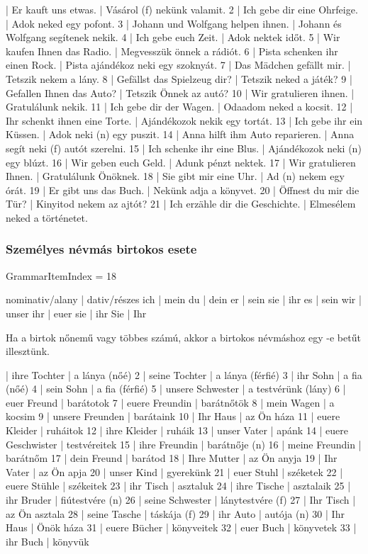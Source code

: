 \documentclass{article}
\newenvironment{desc}{\verbatim}{\endverbatim}
\newenvironment{exmp}{\verbatim}{\endverbatim}
\begin{document}
\begin{exmp}
1 | Er kauft uns etwas. | Vásárol (f) nekünk valamit.
2 | Ich gebe dir eine Ohrfeige. | Adok neked egy pofont.
3 | Johann und Wolfgang helpen ihnen. | Johann és Wolfgang segítenek nekik.
4 | Ich gebe euch Zeit. | Adok nektek időt.
5 | Wir kaufen Ihnen das Radio. | Megvesszük önnek a rádiót.
6 | Pista schenken ihr einen Rock. | Pista ajándékoz neki egy szoknyát.
7 | Das Mädchen gefällt mir. | Tetszik nekem a lány.
8 | Gefällst das Spielzeug dir? | Tetszik neked a játék?
9 | Gefallen Ihnen das Auto? | Tetszik Önnek az autó?
10 | Wir gratulieren ihnen. | Gratulálunk nekik.
11 | Ich gebe dir der Wagen. | Odaadom neked a kocsit.
12 | Ihr schenkt ihnen eine Torte. | Ajándékozok nekik egy tortát.
13 | Ich gebe ihr ein Küssen. | Adok neki (n) egy puszit.
14 | Anna hilft ihm Auto reparieren. | Anna segít neki (f) autót szerelni.
15 | Ich schenke ihr eine Blus. | Ajándékozok neki (n) egy blúzt.
16 | Wir geben euch Geld. | Adunk pénzt nektek.
17 | Wir gratulieren Ihnen. | Gratulálunk Önöknek.
18 | Sie gibt mir eine Uhr. | Ad (n) nekem egy órát.
19 | Er gibt uns das Buch. | Nekünk adja a könyvet.
20 | Öffnest du mir die Tür? | Kinyitod nekem az ajtót?
21 | Ich erzähle dir die Geschichte. | Elmesélem neked a történetet.
\end{exmp}

\subsubsection{Személyes névmás birtokos esete}

GrammarItemIndex = 18

\begin{desc}
nominativ/alany | dativ/részes 
ich             | mein
du              | dein
er              | sein
sie             | ihr
es              | sein
wir             | unser
ihr             | euer
sie             | ihr
Sie             | Ihr

Ha a birtok nőnemű vagy többes számú, akkor a birtokos névmáshoz
egy -e betűt illesztünk.
\end{desc}

\begin{exmp}
1 | ihre Tochter | a lánya (nőé)
2 | seine Tochter | a lánya (férfié)
3 | ihr Sohn | a fia (nőé)
4 | sein Sohn | a fia (férfié)
5 | unsere Schwester | a testvérünk (lány)
6 | euer Freund | barátotok
7 | euere Freundin | barátnőtök
8 | mein Wagen | a kocsim
9 | unsere Freunden | barátaink
10 | Ihr Haus | az Ön háza
11 | euere Kleider | ruháitok
12 | ihre Kleider | ruháik
13 | unser Vater | apánk
14 | euere Geschwister | testvéreitek
15 | ihre Freundin | barátnője (n)
16 | meine Freundin | barátnőm
17 | dein Freund | barátod
18 | Ihre Mutter | az Ön anyja
19 | Ihr Vater | az Ön apja
20 | unser Kind | gyerekünk
21 | euer Stuhl | széketek
22 | euere Stühle | székeitek
23 | ihr Tisch | asztaluk
24 | ihre Tische | asztalaik
25 | ihr Bruder | fiútestvére (n)
26 | seine Schwester | lánytestvére (f)
27 | Ihr Tisch | az Ön asztala
28 | seine Tasche | táskája (f)
29 | ihr Auto | autója (n)
30 | Ihr Haus | Önök háza
31 | euere Bücher | könyveitek
32 | euer Buch | könyvetek
33 | ihr Buch | könyvük
\end{exmp}
\end{document}
